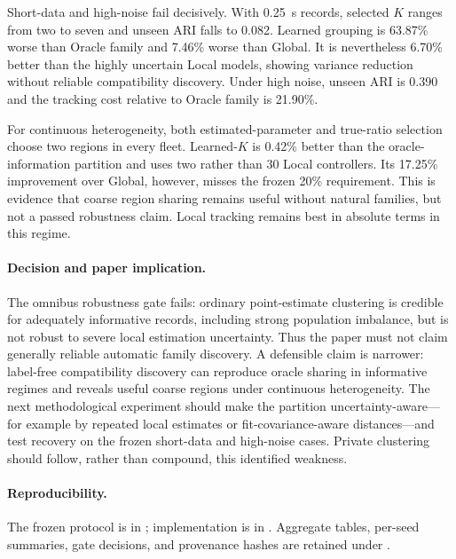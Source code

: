 Short-data and high-noise fail decisively. With 0.25~s records, selected $K$
ranges from two to seven and unseen ARI falls to 0.082. Learned grouping is
63.87\% worse than Oracle family and 7.46\% worse than Global. It is nevertheless
6.70\% better than the highly uncertain Local models, showing variance reduction
without reliable compatibility discovery. Under high noise, unseen ARI is 0.390
and the tracking cost relative to Oracle family is 21.90\%.

For continuous heterogeneity, both estimated-parameter and true-ratio selection
choose two regions in every fleet. Learned-$K$ is 0.42\% better than the oracle-
information partition and uses two rather than 30 Local controllers. Its
17.25\% improvement over Global, however, misses the frozen 20\% requirement.
This is evidence that coarse region sharing remains useful without natural
families, but not a passed robustness claim. Local tracking remains best in
absolute terms in this regime.

\paragraph{Decision and paper implication.}
The omnibus robustness gate fails: ordinary point-estimate clustering is
credible for adequately informative records, including strong population
imbalance, but is not robust to severe local estimation uncertainty. Thus the
paper must not claim generally reliable automatic family discovery. A defensible
claim is narrower: label-free compatibility discovery can reproduce oracle
sharing in informative regimes and reveals useful coarse regions under
continuous heterogeneity. The next methodological experiment should make the
partition uncertainty-aware---for example by repeated local estimates or
fit-covariance-aware distances---and test recovery on the frozen short-data and
high-noise cases. Private clustering should follow, rather than compound, this
identified weakness.

\paragraph{Reproducibility.}
The frozen protocol is in ; implementation
is in . Aggregate
tables, per-seed summaries, gate decisions, and provenance hashes are retained
under .
